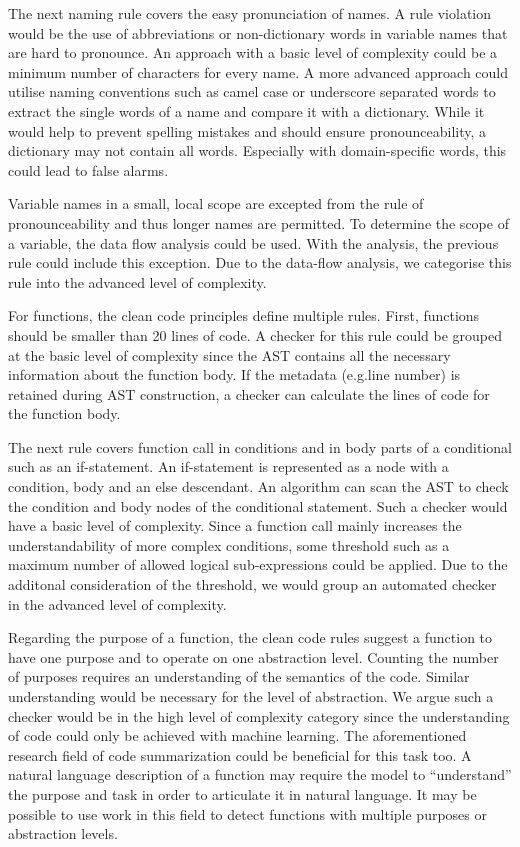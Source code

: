 The next naming rule covers the easy pronunciation of names. A rule violation would be the use of abbreviations or non-dictionary words in variable names that are hard to pronounce. An approach with a basic level of complexity could be a minimum number of characters for every name. A more advanced approach could utilise naming conventions such as camel case or underscore separated words to extract the single words of a name and compare it with a dictionary. While it would help to prevent spelling mistakes and should ensure pronounceability, a dictionary may not contain all words. Especially with domain-specific words, this could lead to false alarms.

Variable names in a small, local scope are excepted from the rule of pronounceability and thus longer names are permitted. To determine the scope of a variable, the data flow analysis could be used. With the analysis, the previous rule could include this exception. Due to the data-flow analysis, we categorise this rule into the advanced level of complexity.



For functions, the clean code principles define multiple rules. 
First, functions should be smaller than 20 lines of code. A checker for this rule could be grouped at the basic level of complexity since the AST contains all the necessary information about the function body. If the metadata (e.g.line number) is retained during AST construction, a checker can calculate the lines of code for the function body.

The next rule covers function call in conditions and in body parts of a conditional such as an if-statement. An if-statement is represented as a node with a condition, body and an else descendant. An algorithm can scan the AST to check the condition and body nodes of the conditional statement. Such a checker would have a basic level of complexity. Since a function call mainly increases the understandability of more complex conditions, some threshold such as a maximum number of allowed logical sub-expressions could be applied. Due to the additonal consideration of the threshold, we would group an automated checker in the advanced level of complexity.

Regarding the purpose of a function, the clean code rules suggest a function to have one purpose and to operate on one abstraction level. Counting the number of purposes requires an understanding of the semantics of the code. Similar understanding would be necessary for the level of abstraction. We argue such a checker would be in the high level of complexity category since the understanding of code could only be achieved with machine learning. The aforementioned research field of code summarization could be beneficial for this task too. A natural language description of a function may require the model to \enquote{understand} the purpose and task in order to articulate it in natural language. It may be possible to use work in this field to detect functions with multiple purposes or abstraction levels.
 
